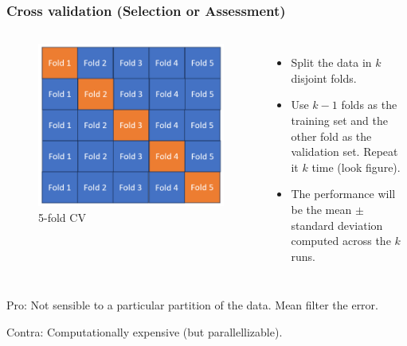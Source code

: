 \documentclass{beamer}
\begin{document}
	\begin{frame}
		\frametitle{Cross validation (Selection or Assessment)}
		\begin{columns}
			\begin{figure}
				\centering
				\includegraphics[scale=0.4]{images/cross-validation}
				\caption{5-fold CV}
			\end{figure}
			\begin{itemize}
				\item Split the data in $k$ disjoint folds.
				\item Use $k-1$ folds as the training set and the other fold as the validation set. Repeat it $k$ time (look figure).
				\item The performance will be the mean $\pm$ standard deviation computed across the $k$ runs.
			\end{itemize}
		\end{columns}
		Pro: Not sensible to a particular partition of the data. Mean filter the error.
		
		Contra: Computationally expensive (but parallellizable).

	\end{frame}
\end{document}
